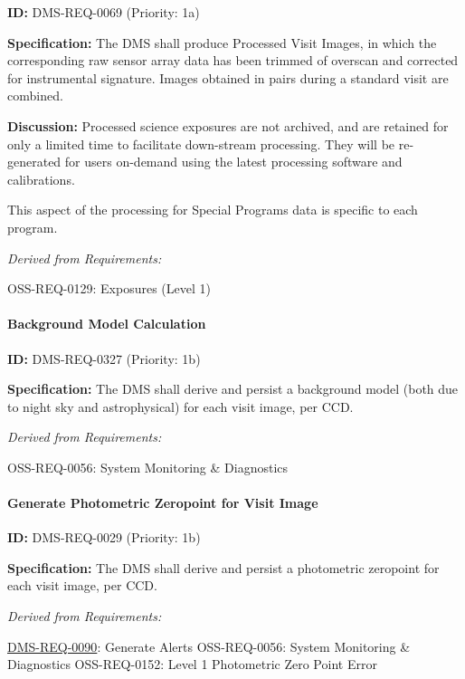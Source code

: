 \documentclass[SE,toc,lsstdraft]{lsstdoc}
\begin{document}
\label{DMS-REQ-0069}
\textbf{ID:} DMS-REQ-0069 (Priority: 1a)

\textbf{Specification: }The DMS shall produce Processed Visit Images, in which the corresponding raw sensor array data has been trimmed of overscan and corrected for instrumental signature. Images obtained in pairs during a standard visit are combined.

\textbf{Discussion:} Processed science exposures are not archived, and are retained for only a limited time to facilitate down-stream processing. They will be re-generated for users on-demand using the latest processing software and calibrations.

This aspect of the processing for Special Programs data is specific to each program.

\emph{Derived from Requirements:}

OSS-REQ-0129:
Exposures (Level 1) \newline

\paragraph{Background Model Calculation}\hfill  %

\label{DMS-REQ-0327}
\textbf{ID:} DMS-REQ-0327 (Priority: 1b)

\textbf{Specification: }The DMS shall derive and persist a background model (both due to night sky and astrophysical) for each visit image, per CCD.

\emph{Derived from Requirements:}

OSS-REQ-0056:
System Monitoring \& Diagnostics \newline

\paragraph{Generate Photometric Zeropoint for Visit Image}\hfill  %

\label{DMS-REQ-0029}
\textbf{ID:} DMS-REQ-0029 (Priority: 1b)

\textbf{Specification:} The DMS shall derive and persist a photometric zeropoint for each visit image, per CCD.

\emph{Derived from Requirements:}

\hyperref[DMS-REQ-0090]{DMS-REQ-0090}:
Generate Alerts \newline
OSS-REQ-0056:
System Monitoring \& Diagnostics \newline
OSS-REQ-0152:
Level 1 Photometric Zero Point Error \newline
\end{document}
